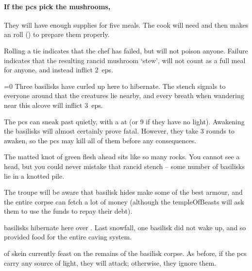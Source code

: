 \begin{multicols}{2}
\paragraph{If the \glspl{pc} pick the mushrooms,}
They will have enough supplies for five meals.
The cook will need  and then makes an  roll (\tn[10]) to prepare them properly.

Rolling a tie indicates that the chef has failed, but will not poison anyone.
Failure indicates that the resulting rancid mushroom `stew', will not count as a full meal for anyone, and instead inflict 2~\glspl{ep}.


\metroMapDistances[t]


\ifnum\value{temperature}=0
  Three \glspl{basilisk} have curled up here to hibernate.
  The stench signals to everyone around that the creatures lie nearby, and every breath when wandering near this alcove will inflict 3~\glspl{ep}.

  The \glspl{pc} can sneak past quietly, with a  at \tn[6] (or 9 if they have no light).
  Awakening the \glspl{basilisk} will almost certainly prove fatal.
  However, they take 3 rounds to awaken, so the \glspl{pc} may kill all of them before any consequences.

  \begin{boxtext}
    The matted knot of green flesh ahead sits like so many rocks.
    You cannot see a head, but you could never mistake that rancid stench -- some number of \glspl{basilisk} lie in a knotted pile.
  \end{boxtext}

  The troupe will be aware that \gls{basilisk} hides make some of the best armour, and the entire corpse can fetch a lot of money (although the \gls{templeOfBeasts} will ask them to use the funds to repay their debt).

\else
  \Glspl{basilisk} hibernate here over .
  Last snowfall, one \gls{basilisk} did not wake up, and so provided food for the entire caving system.

   of skein currently feast on the remains of the \gls{basilisk} corpse.
  As before, if the \glspl{pc} carry any source of light, they will attack; otherwise, they ignore them.


\end{multicols}
